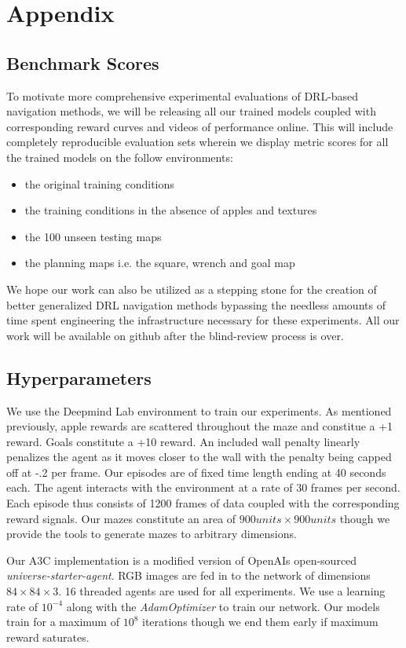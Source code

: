\newpage
\section*{Appendix}

\subsection*{Benchmark Scores}
To motivate more comprehensive experimental evaluations of DRL-based navigation methods, we will be releasing all our trained models coupled with corresponding reward curves and videos of performance online. 
This will include completely reproducible evaluation sets wherein we display metric scores for all the trained models on the follow environments:
\begin{itemize}
    \item the original training conditions
    \item the training conditions in the absence of apples and textures
    \item the 100 unseen testing maps
    \item the planning maps i.e. the square, wrench and goal map
\end{itemize}
We hope our work can also be utilized as a stepping stone for the creation of better generalized DRL navigation methods bypassing the needless amounts of time spent engineering the infrastructure necessary for these experiments. 
All our work will be available on github after the blind-review process is over.

\subsection*{Hyperparameters}

We use the Deepmind Lab environment to train our experiments. 
As mentioned previously, apple rewards are scattered throughout the maze and constitue a +1 reward. 
Goals constitute a +10 reward. An included wall penalty linearly penalizes the agent as it moves closer to the wall with the penalty being capped off at -.2 per frame.
Our episodes are of fixed time length ending at 40 seconds each.
The agent interacts with the environment at a rate of 30 frames per second. 
Each episode thus consists of 1200 frames of data coupled with the corresponding reward signals.
Our mazes constitute an area of $900 units \times 900 units$ though we provide the tools to generate mazes to arbitrary dimensions. 

Our A3C implementation is a modified version of OpenAIs open-sourced \emph{universe-starter-agent}. RGB images are fed in to the network of dimensions $84\times84\times3$. 16 threaded agents are used for all experiments. We use a learning rate of $10^{-4}$ along with the \emph{AdamOptimizer} to train our network. Our models train for a maximum of $10^{8}$ iterations though we end them early if maximum reward saturates. 





